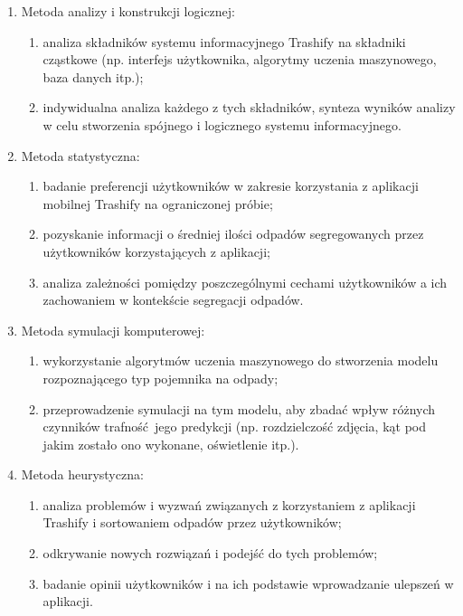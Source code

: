 \documentclass[12pt,twoside]{book}
\begin{document}
\begin{enumerate}
    \item Metoda analizy i konstrukcji logicznej:
    
    \begin{enumerate}[label=--]
        \item analiza składników systemu informacyjnego Trashify na składniki cząstkowe (np. interfejs użytkownika, algorytmy uczenia maszynowego, baza danych itp.);
        \item indywidualna analiza każdego z tych składników,
        synteza wyników analizy w celu stworzenia spójnego i logicznego systemu informacyjnego.
    \end{enumerate}

    \item Metoda statystyczna:
    
    \begin{enumerate}[label=--]
        \item badanie preferencji użytkowników w zakresie korzystania z aplikacji mobilnej Trashify na ograniczonej próbie;
        \item pozyskanie informacji o średniej ilości odpadów segregowanych przez użytkowników korzystających z aplikacji;
        \item analiza zależności pomiędzy poszczególnymi cechami użytkowników a ich zachowaniem w kontekście segregacji odpadów.
    \end{enumerate}

    \item Metoda symulacji komputerowej:
    
    \begin{enumerate}[label=--]
        \item wykorzystanie algorytmów uczenia maszynowego do stworzenia modelu rozpoznającego typ pojemnika na odpady;
        \item przeprowadzenie symulacji na tym modelu, aby zbadać wpływ różnych czynników trafność jego predykcji (np. rozdzielczość zdjęcia, kąt pod jakim zostało ono wykonane, oświetlenie itp.).
    \end{enumerate}

    \item Metoda heurystyczna:
    
       
    \begin{enumerate}[label=--]
        \item analiza problemów i wyzwań związanych z korzystaniem z aplikacji Trashify i sortowaniem odpadów przez użytkowników;
        \item odkrywanie nowych rozwiązań i podejść do tych problemów;
        \item badanie opinii użytkowników i na ich podstawie wprowadzanie ulepszeń w aplikacji.
    \end{enumerate}

\end{enumerate}
\end{document}
